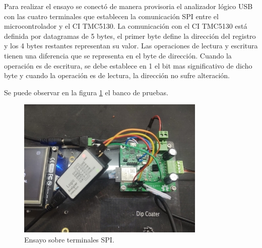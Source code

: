  





Para realizar el ensayo se conectó de manera provisoria el analizador lógico USB con las cuatro terminales que establecen la comunicación SPI entre el microcontrolador y el CI TMC5130. La comunicación con el CI TMC5130 está definida por datagramas de 5 bytes, el primer byte define la dirección del registro y los 4 bytes restantes representan su valor. Las operaciones de lectura y escritura tienen una diferencia que se representa en el byte de dirección. Cuando la operación es de escritura, se debe establece en 1 el bit mas significativo de dicho byte y cuando la operación es de lectura, la dirección no sufre alteración.

Se puede observar en la figura \ref{fig:ensayo_spi} el banco de pruebas.

\begin{figure}[h!]
\centering 
\includegraphics[width=0.8\textwidth]{./Figures/ensayo_spi.jpeg}
\caption{Ensayo sobre terminales SPI.}
\label{fig:ensayo_spi}
\end{figure}

